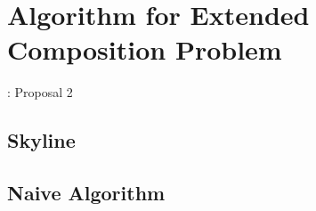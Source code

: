 \documentclass[senior,final,11pt]{iscs-thesis}
\begin{document}
\section{Algorithm for Extended Composition Problem}: Proposal 2%
%

\subsection{Skyline}%






\subsection{Naive Algorithm}%
 
 
\end{document}
